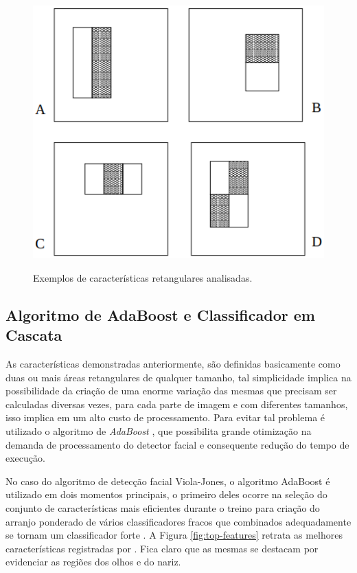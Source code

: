 \begin{figure}[htb]
    \centering
    \caption{Exemplos de características retangulares analisadas.}
    \includegraphics[scale=.5]{figs/features.png}
    \label{fig:features}
\end{figure}

\subsection{Algoritmo de AdaBoost e Classificador em Cascata}

As características demonstradas anteriormente, são definidas basicamente como duas ou mais áreas retangulares de qualquer tamanho, tal simplicidade implica na possibilidade da criação de uma enorme variação das mesmas que precisam ser calculadas diversas vezes, para cada parte de imagem e com diferentes tamanhos, isso implica em um alto custo de processamento. Para evitar tal problema é utilizado o algoritmo de \textit{AdaBoost} \cite{adaboost-Freund}, que possibilita grande otimização na demanda de processamento do detector facial e consequente redução do tempo de execução.

No caso do algoritmo de detecção facial Viola-Jones, o algoritmo AdaBoost é utilizado em dois momentos principais, o primeiro deles ocorre na seleção do conjunto de características mais eficientes durante o treino para criação do arranjo ponderado de vários classificadores fracos que combinados adequadamente se tornam um classificador forte \cite{fabio-luciana-2015}. A Figura \ref{fig:top-features} retrata as melhores características registradas por  \cite{paper-viola-jones}. Fica claro que as mesmas se destacam por evidenciar as regiões dos olhos e do nariz.

